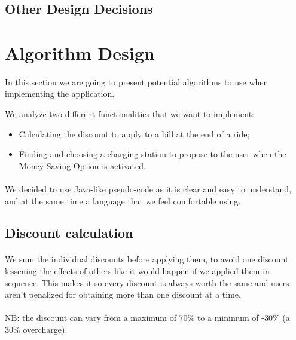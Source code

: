 \documentclass[english]{article}
\begin{document}
\subsection{Other Design Decisions}

\newpage

\section{Algorithm Design}

\paragraph{}
In this section we are going to present potential algorithms to use when implementing the application.

We analyze two different functionalities that we want to implement:
\begin{itemize}
	\item{Calculating the discount to apply to a bill at the end of a ride;}
	\item{Finding and choosing a charging station to propose to the user when the Money Saving Option is activated.}
\end{itemize}

\paragraph{}
We decided to use Java-like pseudo-code as it is clear and easy to understand, and at the same time a language that we feel comfortable using.

\subsection{Discount calculation}



\paragraph{}
We sum the individual discounts before applying them, to avoid one discount lessening the effects of others like it would happen if we applied them in sequence. This makes it so every discount is always worth the same and users aren't penalized for obtaining more than one discount at a time.

\paragraph{}
NB: the discount can vary from a maximum of 70\% to a minimum of -30\% (a 30\% overcharge).
\end{document}
